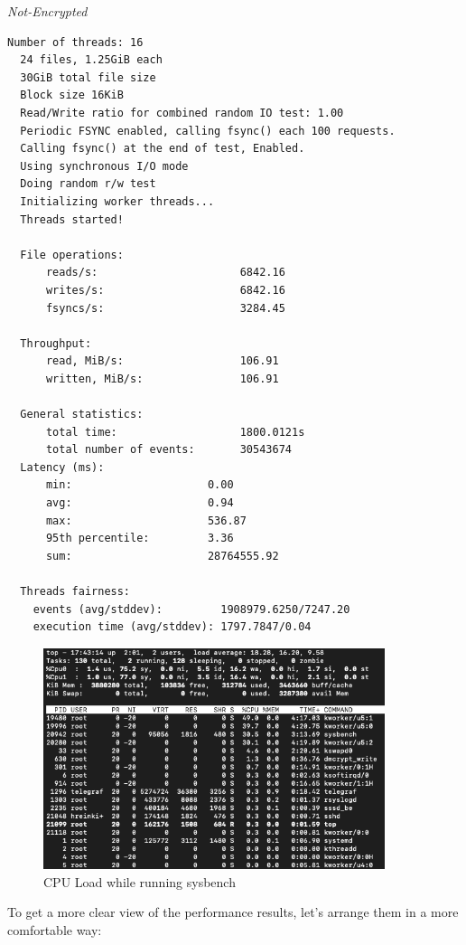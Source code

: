 \noindent\begin{minipage}[t]{0.45\linewidth}
  \centering
  \textit{Not-Encrypted}
  \begin{lstlisting}[basicstyle=\tiny,frame=single, label=cpu_test2]
  Number of threads: 16
  24 files, 1.25GiB each
  30GiB total file size
  Block size 16KiB
  Read/Write ratio for combined random IO test: 1.00
  Periodic FSYNC enabled, calling fsync() each 100 requests.
  Calling fsync() at the end of test, Enabled.
  Using synchronous I/O mode
  Doing random r/w test
  Initializing worker threads...
  Threads started!

  File operations:
      reads/s:                      6842.16
      writes/s:                     6842.16
      fsyncs/s:                     3284.45
  
  Throughput:
      read, MiB/s:                  106.91
      written, MiB/s:               106.91
  
  General statistics:
      total time:                   1800.0121s
      total number of events:       30543674
  Latency (ms):
      min:                     0.00
      avg:                     0.94
      max:                     536.87
      95th percentile:         3.36
      sum:                     28764555.92
  
  Threads fairness:
    events (avg/stddev):         1908979.6250/7247.20
    execution time (avg/stddev): 1797.7847/0.04
  \end{lstlisting}
\end{minipage}


\begin{figure}
  \includegraphics[width=10cm]{images/image5.png}
  \centering
  \caption{CPU Load while running sysbench}
\end{figure}

\newpage
To get a more clear view of the performance results, let's arrange them in a more comfortable way:

